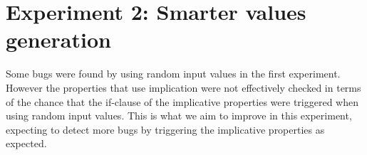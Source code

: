 \chapter{Experiment 2: Smarter values generation}
\label{chp:experiment2}
Some bugs were found by using random input values in the first experiment. However the properties that use implication were not effectively checked in terms of the chance that the if-clause of the implicative properties were triggered when using random input values. This is what we aim to improve in this experiment, expecting to detect more bugs by triggering the implicative properties as expected.

